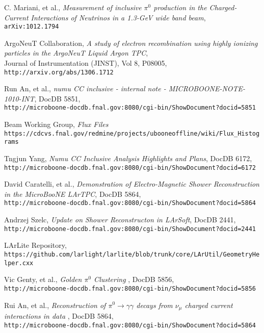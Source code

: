 \documentclass[12pt]{article}
\begin{document}
\begin{thebibliography}{9}
  C. Mariani, et al., \emph{Measurement of inclusive $\pi^0$ production in the Charged-Current Interactions of Neutrinos in a 1.3-GeV wide band beam},\\
  \texttt{arXiv:1012.1794}

  ArgoNeuT Collaboration, \emph{A study of electron recombination using highly ionizing particles in the ArgoNeuT Liquid Argon TPC},\\
  Journal of Instrumentation (JINST), Vol 8, P08005, \texttt{http://arxiv.org/abs/1306.1712}

  Run An, et al., \emph{numu CC inclusive - internal note - MICROBOONE-NOTE-1010-INT}, DocDB 5851,\\
  \texttt{http://microboone-docdb.fnal.gov:8080/cgi-bin/ShowDocument?docid=5851}
  
  Beam Working Group, \emph{Flux Files}\\
  \texttt{https://cdcvs.fnal.gov/redmine/projects/ubooneoffline/wiki/Flux\_Histograms}

  Tngjun Yang, \emph{Numu CC Inclusive Analysis Highlights and Plans}, DocDB 6172,\\
  \texttt{http://microboone-docdb.fnal.gov:8080/cgi-bin/ShowDocument?docid=6172}

  David Caratelli, et al., \emph{Demonstration of Electro-Magnetic Shower Reconstruction in the MicroBooNE LArTPC}, DocDB 5864,\\
  \texttt{http://microboone-docdb.fnal.gov:8080/cgi-bin/ShowDocument?docid=5864}



  Andrzej Szelc, \emph{Update on Shower Reconstructon in LArSoft}, DocDB 2441,\\
  \texttt{http://microboone-docdb.fnal.gov:8080/cgi-bin/ShowDocument?docid=2441}

  LArLite Repository, \\
  \texttt{https://github.com/larlight/larlite/blob/trunk/core/LArUtil/GeometryHelper.cxx}
  
   Vic Genty, et al., \emph{Golden $\pi^0$ Clustering }, DocDB 5856,\\
   \texttt{http://microboone-docdb.fnal.gov:8080/cgi-bin/ShowDocument?docid=5856}
   
  Rui An, et al., \emph{Reconstruction of $\pi^0 \rightarrow \gamma\gamma$ decays from $\nu_\mu$ charged current interactions in data }, DocDB 5864,\\
   \texttt{http://microboone-docdb.fnal.gov:8080/cgi-bin/ShowDocument?docid=5864}
   

\end{thebibliography}
\end{document}

